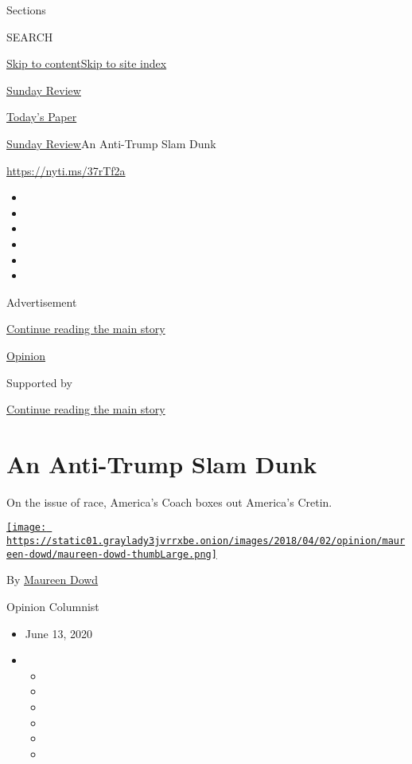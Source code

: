 Sections

SEARCH

\protect\hyperlink{site-content}{Skip to
content}\protect\hyperlink{site-index}{Skip to site index}

\href{https://www.nytimes3xbfgragh.onion/section/opinion/sunday}{Sunday
Review}

\href{https://myaccount.nytimes3xbfgragh.onion/auth/login?response_type=cookie\&client_id=vi}{}

\href{https://www.nytimes3xbfgragh.onion/section/todayspaper}{Today's
Paper}

\href{/section/opinion/sunday}{Sunday Review}\textbar{}An Anti-Trump
Slam Dunk

\url{https://nyti.ms/37rTf2a}

\begin{itemize}
\item
\item
\item
\item
\item
\item
\end{itemize}

Advertisement

\protect\hyperlink{after-top}{Continue reading the main story}

\href{/section/opinion}{Opinion}

Supported by

\protect\hyperlink{after-sponsor}{Continue reading the main story}

\hypertarget{an-anti-trump-slam-dunk}{%
\section{An Anti-Trump Slam Dunk}\label{an-anti-trump-slam-dunk}}

On the issue of race, America's Coach boxes out America's Cretin.

\href{https://www.nytimes3xbfgragh.onion/by/maureen-dowd}{\texttt{[image: https://static01.graylady3jvrrxbe.onion/images/2018/04/02/opinion/maureen-dowd/maureen-dowd-thumbLarge.png]}}

By \href{https://www.nytimes3xbfgragh.onion/by/maureen-dowd}{Maureen
Dowd}

Opinion Columnist

\begin{itemize}
\item
  June 13, 2020
\item
  \begin{itemize}
  \item
  \item
  \item
  \item
  \item
  \item
  \end{itemize}
\end{itemize}

